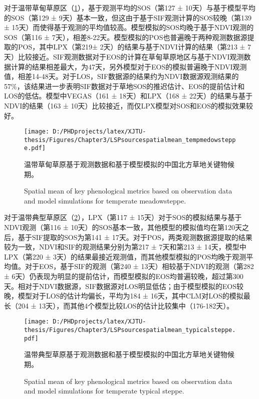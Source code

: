 对于温带草甸草原区（\cref{figure38}），基于观测平均的SOS（第127 ± 10天）与基于模型平均的SOS（第129 ± 9天）基本一致，但这由于基于SIF观测计算的SOS较晚（第139 ± 15天）而使得基于观测的平均值较高。模型模拟的SOS均晚于基于NDVI观测的SOS（第116 ± 7天），相差8-22天。模型模拟的POS也普遍晚于两种观测数据源提取的POS，其中LPX（第219± 2天）的结果与基于NDVI计算的结果（第213 ± 7天）比较接近。SIF观测数据对于EOS的计算在草甸草原地区与基于NDVI观测数据计算的结果相差最大，为47天，另外模型对于EOS的模拟普遍晚于NDVI观测值，相差14-48天。对于LOS，SIF数据源的结果约为NDVI数据源观测结果的57\%，该结果进一步表明SIF数据对于草地SOS的推迟估计、EOS的提前估计和LOS的低估。模型中VEGAS（161 ± 18天）和LPX（168 ± 22天）的结果与基于NDVI的结果（163 ± 10天）比较接近，而仅LPX模型对SOS和EOS的模拟效果较好。

\begin{figure}[h]
  \centering
  \texttt{[image: D:/PHDprojects/latex/XJTU-thesis/Figures/Chapter3/LSPsourcespatialmean\_tempmedowsteppe.pdf]}
  \caption{温带草甸草原基于观测数据和基于模型模拟的中国北方草地关键物候期。}
  \addtocounter{figure}{-1}
  \vspace{5pt}
  \renewcommand{\figurename}{Fig}
  \caption{Spatial mean of key phenological metrics based on observation data and model simulations for temperate meadowsteppe.}
  \label{figure38}
\end{figure}

对于温带典型草原区（\cref{figure39}），LPX（第117 ± 15天）对于SOS的模拟结果与基于NDVI观测（第116 ± 10天）的SOS基本一致，其他模型的模拟值均在第120天之后，基于SIF提取的SOS为第141 ± 17天。对于POS，两类观测数据源提取的结果较为一致，NDVI和SIF的观测结果分别为第217 ± 7天和第213 ± 14天，模型中LPX（第220 ± 3天）的结果最接近观测值，而其他模型模拟的POS均晚于观测平均值。对于EOS，基于SIF的观测（第240 ± 13天）相较基于NDVI的观测（第282 ± 6天）仍表现为明显的提前估计，而模型模拟的EOS均普遍较晚，超过第300天。相对于NDVI数据源，SIF数据源对LOS明显低估；由于模型模拟的EOS较晚，模型对于LOS的估计均偏长，平均为184 ± 16天，其中CLM对LOS的模拟最长（204 ± 13天），而其他4个模型比较LOS的估计比较集中（176-182天）。

\begin{figure}[h]
  \centering
  \texttt{[image: D:/PHDprojects/latex/XJTU-thesis/Figures/Chapter3/LSPsourcespatialmean\_typicalsteppe.pdf]}
  \caption{温带典型草原基于观测数据和基于模型模拟的中国北方草地关键物候期。}
  \addtocounter{figure}{-1}
  \vspace{5pt}
  \renewcommand{\figurename}{Fig}
  \caption{Spatial mean of key phenological metrics based on observation data and model simulations for temperate typical steppe.}
  \label{figure39}
\end{figure}

